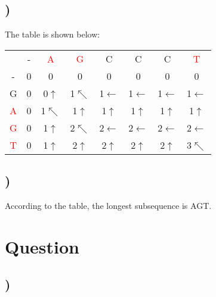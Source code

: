 \documentclass{article}
\begin{document}
\subsection{)}
The table is shown below:\\
\begin{center}
\begin{tabular}{c|c|c|c|c|c|c|c|}
\multicolumn{1}{c}{ } & \multicolumn{1}{c}{-} & \multicolumn{1}{c}{\textcolor{red}{A}} & \multicolumn{1}{c}{\textcolor{red}{G}} & \multicolumn{1}{c}{C} & \multicolumn{1}{c}{C} & \multicolumn{1}{c}{C} & \multicolumn{1}{c}{\textcolor{red}{T}} \\
\cline{2-8}
- & 0 & 0 & 0 & 0 & 0 & 0 & 0 \\
\cline{2-8}
G & 0 & 0$\uparrow$ & 1$\nwarrow$ & 1$\leftarrow$ & 1$\leftarrow$ & 1$\leftarrow$ & 1$\leftarrow$ \\
\cline{2-2}
\textcolor{red}{A} & 0 & \cellcolor{red!50}1$\nwarrow$ & 1$\uparrow$ & 1$\uparrow$ & 1$\uparrow$ & 1$\uparrow$ & 1$\uparrow$ \\
\cline{2-2}
\textcolor{red}{G} & 0 & 1$\uparrow$ & \cellcolor{red!50}2$\nwarrow$ & \cellcolor{red!50}2$\leftarrow$ & \cellcolor{red!50}2$\leftarrow$ & \cellcolor{red!50}2$\leftarrow$ & \cellcolor{white}2$\leftarrow$ \\
\cline{2-2}
\textcolor{red}{T} & 0 & 1$\uparrow$ & 2$\uparrow$ & 2$\uparrow$ & 2$\uparrow$ & 2$\uparrow$ & \cellcolor{red!50}3$\nwarrow$ \\
\cline{2-8}
\end{tabular}
\end{center}

\subsection{)}
According to the table, the longest subsequence is AGT.

\section{Question }
\subsection{)}
\end{document}
